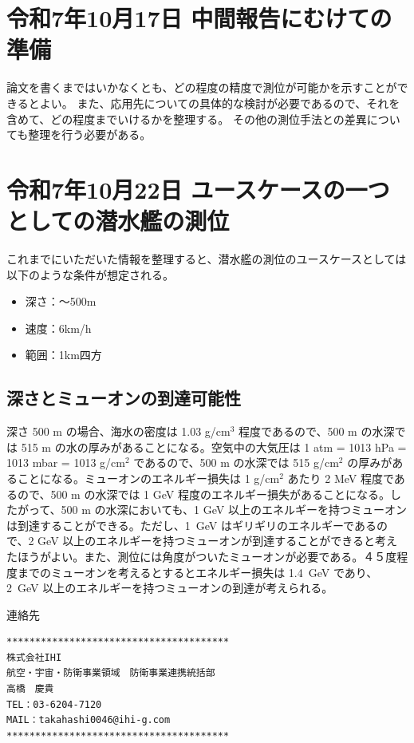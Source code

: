 
\section{令和7年10月17日 中間報告にむけての準備}

論文を書くまではいかなくとも、どの程度の精度で測位が可能かを示すことができるとよい。
また、応用先についての具体的な検討が必要であるので、それを含めて、どの程度までいけるかを整理する。
その他の測位手法との差異についても整理を行う必要がある。

\section{令和7年10月22日 ユースケースの一つとしての潜水艦の測位}

これまでにいただいた情報を整理すると、潜水艦の測位のユースケースとしては以下のような条件が想定される。

\begin{itemize}
  \item 深さ：～500m
  \item 速度：6km/h
  \item 範囲：1km四方
\end{itemize} 
\subsection{深さとミューオンの到達可能性}
深さ 500 m の場合、海水の密度は 1.03 g/cm$^3$ 程度であるので、500 m の水深では 515 m の水の厚みがあることになる。空気中の大気圧は 1 atm = 1013 hPa = 1013 mbar = 1013 g/cm$^2$ であるので、500 m の水深では 515 g/cm$^2$ の厚みがあることになる。ミューオンのエネルギー損失は 1 g/cm$^2$ あたり 2 MeV 程度であるので、500 m の水深では 1 GeV 程度のエネルギー損失があることになる。したがって、500 m の水深においても、1 GeV 以上のエネルギーを持つミューオンは到達することができる。ただし、1~GeV はギリギリのエネルギーであるので、2 GeV 以上のエネルギーを持つミューオンが到達することができると考えたほうがよい。また、測位には角度がついたミューオンが必要である。４５度程度までのミューオンを考えるとするとエネルギー損失は 1.4~GeV であり、2~GeV 以上のエネルギーを持つミューオンの到達が考えられる。

\begin{codebox}{連絡先}
  \begin{verbatim}
***************************************
株式会社IHI
航空・宇宙・防衛事業領域　防衛事業連携統括部
高橋　慶貴
TEL：03-6204-7120
MAIL：takahashi0046@ihi-g.com
***************************************
\end{verbatim}
\end{codebox}



